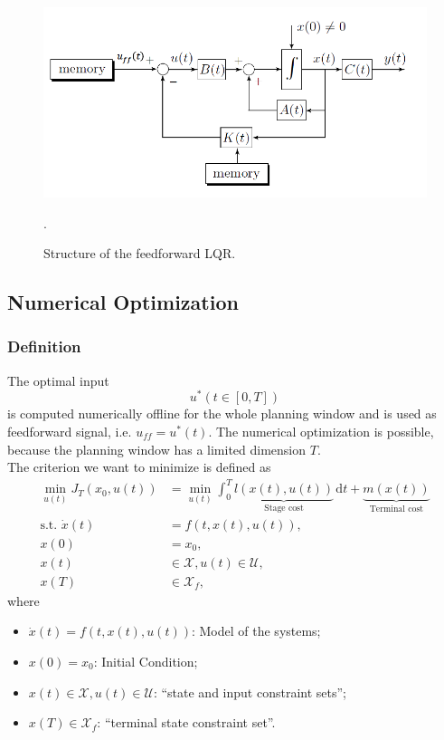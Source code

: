 \documentclass[a4paper,12 pt]{article}
\numberwithin{equation}{section}
\theoremstyle{definition}
\theoremstyle{remark}
\theoremstyle{definition}
\theoremstyle{definition}
\theoremstyle{definition}
\theoremstyle{remark}
\begin{document}
\begin{figure}[h]
\centering
\includegraphics[width=0.75\columnwidth]{ff}
\caption{Structure of the feedforward LQR.}
\label{fig:ff}.
\end{figure}

\newpage

\subsection{Numerical Optimization}
\subsubsection{Definition}
The optimal input 
\begin{equation}
u^*(t\in [0,T])
\end{equation}
is computed numerically offline for the whole planning window  and is used as feedforward signal, i.e. $u_{ff}=u^*(t)$. The numerical optimization is possible, because the planning window has a limited dimension $T$. \\
The criterion we want to minimize is defined as
\begin{equation} \label{numopt}
\begin{split}
\min_{u(t)}J_T(x_0,u(t))&=\min_{u(t)}\int_0^T\underbrace{l(x(t),u(t))}_\text{Stage cost}\,\text{d}t+\underbrace{m(x(t))}_{\text{Terminal cost}} \\
\text{s.t. }  \dot x(t)&=f(t,x(t),u(t)), \\
x(0)&=x_0,\\
x(t)&\in\mathcal{X},u(t)\in\mathcal{U}, \\
x(T)&\in\mathcal{X}_f,
\end{split}
\end{equation}
where 
\begin{itemize}
\item $\dot x(t)=f(t,x(t),u(t))$: Model of the systems;
\item $x(0)=x_0$: Initial Condition;
\item $x(t)\in\mathcal{X},u(t)\in\mathcal{U}$: ``state and input constraint sets'';
\item $x(T)\in\mathcal{X}_f$: ``terminal state constraint set''.
\end{itemize}
\end{document}
